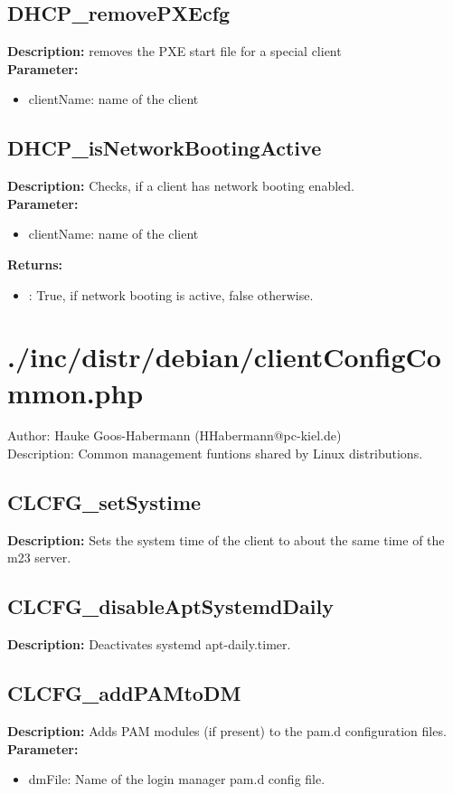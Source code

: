 \subsection{DHCP\_removePXEcfg}
\textbf{Description:} removes the PXE start file for a special client\\
\textbf{Parameter:}
\begin{itemize}
\item clientName: name of the client
\end{itemize}

\subsection{DHCP\_isNetworkBootingActive}
\textbf{Description:} Checks, if a client has network booting enabled.\\
\textbf{Parameter:}
\begin{itemize}
\item clientName: name of the client
\end{itemize}
\textbf{Returns:}
\begin{itemize}
\item : True, if network booting is active, false otherwise.
\end{itemize}

\newpage\section{./inc/distr/debian/clientConfigCommon.php}
 Author: Hauke Goos-Habermann (HHabermann@pc-kiel.de)\\
 Description: Common management funtions shared by Linux distributions.\\

\subsection{CLCFG\_setSystime}
\textbf{Description:} Sets the system time of the client to about the same time of the m23 server.\\

\subsection{CLCFG\_disableAptSystemdDaily}
\textbf{Description:} Deactivates systemd apt-daily.timer.\\

\subsection{CLCFG\_addPAMtoDM}
\textbf{Description:} Adds PAM modules (if present) to the pam.d configuration files.\\
\textbf{Parameter:}
\begin{itemize}
\item dmFile: Name of the login manager pam.d config file.
\end{itemize}

